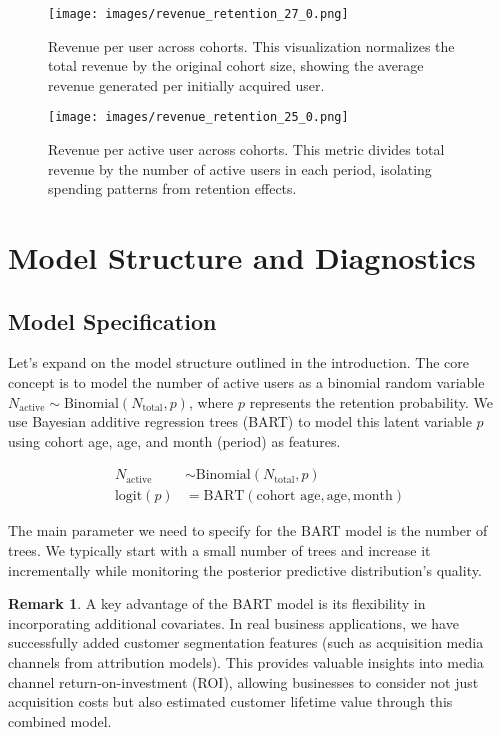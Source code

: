 \documentclass[11pt]{amsart}
\theoremstyle{definition}
\newtheorem{remark}{Remark}
\begin{document}
\begin{figure}
    \centering
    \texttt{[image: images/revenue\_retention\_27\_0.png]}
    \caption{Revenue per user across cohorts. This visualization normalizes the total revenue by the original cohort size,
        showing the average revenue generated per initially acquired user.}
    \label{fig:revenue_per_user}
\end{figure}

\begin{figure}
    \centering
    \texttt{[image: images/revenue\_retention\_25\_0.png]}
    \caption{Revenue per active user across cohorts. This metric divides total revenue by the number of active users in each
        period, isolating spending patterns from retention effects.}
    \label{fig:revenue_per_active_user}
\end{figure}

\section{Model Structure and Diagnostics}

\subsection{Model Specification}

Let's expand on the model structure outlined in the introduction. The core concept is to model the number of active users
as a binomial random variable $N_{\text{active}} \sim \text{Binomial}(N_{\text{total}}, p)$, where $p$ represents the retention
probability. We use Bayesian additive regression trees (BART) to model this latent variable $p$ using cohort age, age, and
month (period) as features.

\begin{align*}
    N_{\text{active}} & \sim \text{Binomial}(N_{\text{total}}, p)                  \\
    \textrm{logit}(p) & = \text{BART}(\text{cohort age}, \text{age}, \text{month})
\end{align*}

The main parameter we need to specify for the BART model is the number of trees. We typically start with a small number of
trees and increase it incrementally while monitoring the posterior predictive distribution's quality.

\begin{remark}
    A key advantage of the BART model is its flexibility in incorporating additional covariates. In real business
    applications, we have successfully added customer segmentation features (such as acquisition media channels from
    attribution models). This provides valuable insights into media channel return-on-investment (ROI), allowing businesses
    to consider not just acquisition costs but also estimated customer lifetime value through this combined model.
\end{remark}
\end{document}
